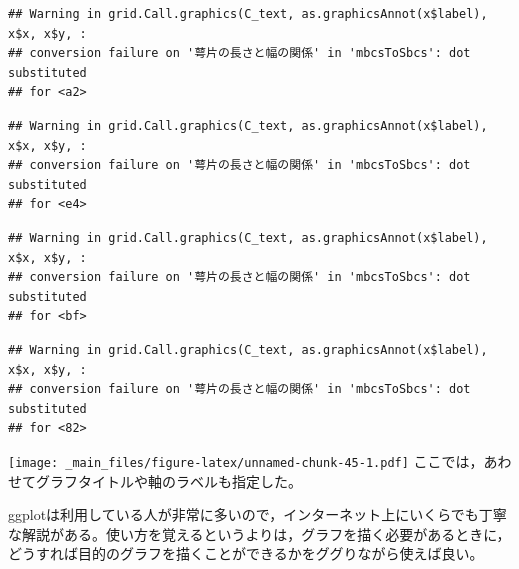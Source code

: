 \documentclass[
]{book}
\begin{document}
\begin{verbatim}
## Warning in grid.Call.graphics(C_text, as.graphicsAnnot(x$label), x$x, x$y, :
## conversion failure on '萼片の長さと幅の関係' in 'mbcsToSbcs': dot substituted
## for <a2>
\end{verbatim}

\begin{verbatim}
## Warning in grid.Call.graphics(C_text, as.graphicsAnnot(x$label), x$x, x$y, :
## conversion failure on '萼片の長さと幅の関係' in 'mbcsToSbcs': dot substituted
## for <e4>
\end{verbatim}

\begin{verbatim}
## Warning in grid.Call.graphics(C_text, as.graphicsAnnot(x$label), x$x, x$y, :
## conversion failure on '萼片の長さと幅の関係' in 'mbcsToSbcs': dot substituted
## for <bf>
\end{verbatim}

\begin{verbatim}
## Warning in grid.Call.graphics(C_text, as.graphicsAnnot(x$label), x$x, x$y, :
## conversion failure on '萼片の長さと幅の関係' in 'mbcsToSbcs': dot substituted
## for <82>
\end{verbatim}

\texttt{[image: \_main\_files/figure-latex/unnamed-chunk-45-1.pdf]}
ここでは，あわせてグラフタイトルや軸のラベルも指定した。

ggplotは利用している人が非常に多いので，インターネット上にいくらでも丁寧な解説がある。使い方を覚えるというよりは，グラフを描く必要があるときに，どうすれば目的のグラフを描くことができるかをググりながら使えば良い。

  
\end{document}
